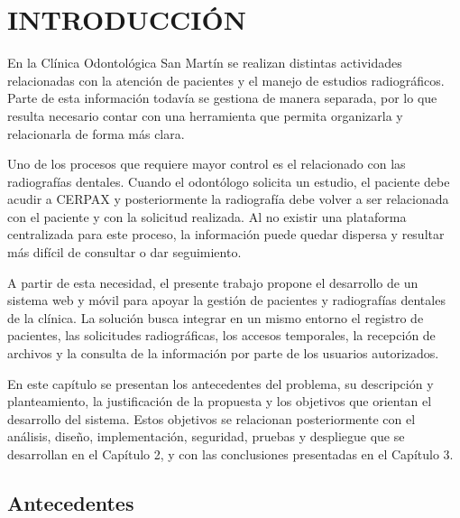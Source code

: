 	
	
	\chapter{INTRODUCCIÓN}
	
	En la Clínica Odontológica San Martín se realizan distintas actividades
	relacionadas con la atención de pacientes y el manejo de estudios
	radiográficos. Parte de esta información todavía se gestiona de manera
	separada, por lo que resulta necesario contar con una herramienta que
	permita organizarla y relacionarla de forma más clara.
	
	Uno de los procesos que requiere mayor control es el relacionado con las
	radiografías dentales. Cuando el odontólogo solicita un estudio, el paciente
	debe acudir a CERPAX y posteriormente la radiografía debe volver a ser
	relacionada con el paciente y con la solicitud realizada. Al no existir una
	plataforma centralizada para este proceso, la información puede quedar
	dispersa y resultar más difícil de consultar o dar seguimiento.
	
	A partir de esta necesidad, el presente trabajo propone el desarrollo de un
	sistema web y móvil para apoyar la gestión de pacientes y radiografías
	dentales de la clínica. La solución busca integrar en un mismo entorno el
	registro de pacientes, las solicitudes radiográficas, los accesos temporales,
	la recepción de archivos y la consulta de la información por parte de los
	usuarios autorizados.
	
	En este capítulo se presentan los antecedentes del problema, su descripción
	y planteamiento, la justificación de la propuesta y los objetivos que orientan
	el desarrollo del sistema. Estos objetivos se relacionan posteriormente con
	el análisis, diseño, implementación, seguridad, pruebas y despliegue que se
	desarrollan en el Capítulo 2, y con las conclusiones presentadas en el
	Capítulo 3.
	
	
	
	
	
	
	\section{Antecedentes}
	
